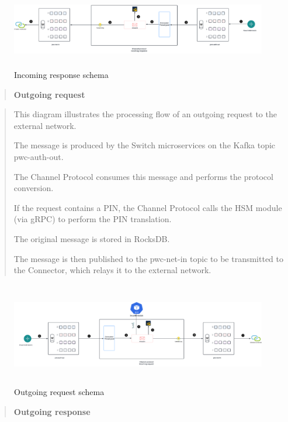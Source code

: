 \documentclass[12pt,a4paper]{report}
\begin{document}
\begin{figure}[H]
\centering
\includegraphics[width=6.82134in,height=1.33791in]{media/image58.png}
\caption{Incoming response schema}
\label{fig:}
\end{figure}


\begin{quote}
\textbf{Outgoing request}
\end{quote}

\begin{quote}
This diagram illustrates the processing flow of an outgoing request to
the external network.

The message is produced by the Switch microservices on the Kafka topic
pwc-auth-out.

The Channel Protocol consumes this message and performs the protocol
conversion.

If the request contains a PIN, the Channel Protocol calls the HSM module
(via gRPC) to perform the PIN translation.

The original message is stored in RocksDB.

The message is then published to the pwc-net-in topic to be transmitted
to the Connector, which relays it to the external network.
\end{quote}

\begin{figure}[H]
\centering
\includegraphics[width=6.79462in,height=1.77023in]{media/image59.png}
\caption{Outgoing request schema}
\label{fig:}
\end{figure}

\begin{quote}
\textbf{Outgoing response}
\end{quote}
\end{document}
